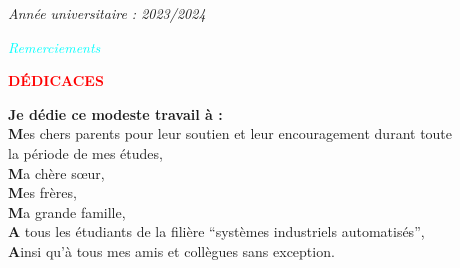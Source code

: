 \documentclass[a4paper,12pt]{report}
\begin{document}
\begin{titlepage}
\vspace{0.8cm}
\begin{center}
\textit{Ann\'e{}e universitaire : 2023/2024}
\end{center}
\end{titlepage}
\newpage
\thispagestyle{empty}
\begin{center}
\begin{Huge}
\textcolor{cyan}{\textit{Remerciements}}
\end{Huge}
\end{center}\vspace{2cm}

\newpage
\thispagestyle{empty}
\begin{center}
\begin{Huge}
\textcolor{red}{\textbf{D\'E{}DICACES}}\\ \vspace{2cm}
\end{Huge}
\textbf{Je dédie ce modeste travail à :}\\
\textbf{M}es chers parents pour leur soutien et leur encouragement durant toute\\
la période de mes études,\\
\textbf{M}a chère sœur,\\
\textbf{M}es frères,\\
\textbf{M}a grande famille,\\
\textbf{A} tous les étudiants de la filière ``systèmes industriels automatisés'',\\
\textbf{A}insi qu’à tous mes amis et collègues sans exception.\\
\end{center}
\end{document}

